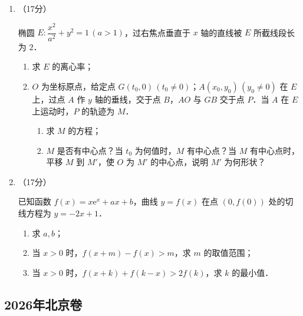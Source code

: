 \begin{description}
\begin{enumerate}[leftmargin=5pt]
        \item （17分）

        椭圆 $E:\dfrac{x^2}{a^2}+y^2=1\,(a>1)$，过右焦点垂直于 $x$ 轴的直线被 $E$ 所截线段长为 $2$．

        \begin{enumerate}[label=(\arabic*)]
            \item 求 $E$ 的离心率；
            \item $O$ 为坐标原点，给定点 $G(t_0,0)\,(t_0\neq0)$；$A(x_0,y_0)\,(y_0\neq0)$ 在 $E$ 上，过点 $A$ 作 $y$ 轴的垂线，交于点 $B$，$AO$ 与 $GB$ 交于点 $P$．当 $A$ 在 $E$ 上运动时，$P$ 的轨迹为 $M$．
            \begin{enumerate}[label=(\roman*)]
                \item 求 $M$ 的方程；
                \item $M$ 是否有中心点？当 $t_0$ 为何值时，$M$ 有中心点？当 $M$ 有中心点时，平移 $M$ 到 $M'$，使 $O$ 为 $M'$ 的中心点，说明 $M'$ 为何形状？
            \end{enumerate}
        \end{enumerate}

        \item （17分）

        已知函数 $f(x)=x\mathrm{e}^x+ax+b$，曲线 $y=f(x)$ 在点 $(0,f(0))$ 处的切线方程为 $y=-2x+1$．

        \begin{enumerate}[label=(\arabic*)]
            \item 求 $a,b$；
            \item 当 $x>0$ 时，$f(x+m)-f(x)>m$，求 $m$ 的取值范围；
            \item 当 $x>0$ 时，$f(x+k)+f(k-x)>2f(k)$，求 $k$ 的最小值．
        \end{enumerate}
    \end{enumerate}
\end{description}
\clearpage


\subsection{2026年北京卷}\label{gk:2026年北京卷}

